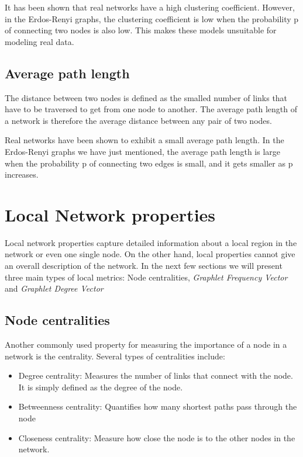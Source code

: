 It has been shown that real networks have a high clustering coefficient.
However, in the Erdos-Renyi graphs, the clustering coefficient is low when the
probability p of connecting two nodes is also low. This makes these
models unsuitable for modeling real data.

\subsection{Average path length}

The distance between two nodes is defined as the smalled number of links that
have to be traversed to get from one node to another. The average path length
of a network is therefore the average distance between any pair of two nodes. 

Real networks have been shown to exhibit a small average path length. In the
Erdos-Renyi graphs we have just mentioned, the average path length is large
when the probability p of connecting two edges is small, and it gets smaller as
p increases.





\section{Local Network properties}

Local network properties capture detailed information about a local region in
the network or even one single node. On the other hand, local properties cannot
give an overall description of the network. In the next few sections we will
present three main types of local metrics: Node centralities, \emph{Graphlet
Frequency Vector} and \emph{Graphlet Degree Vector}

\subsection{Node centralities}

Another commonly used property for measuring the importance of a node in a
network is the centrality. Several types of centralities include:
\begin{itemize}
 \item Degree centrality: Measures the number of links that connect with the
node. It is simply defined as the degree of the node.
 \item Betweenness centrality: Quantifies how many shortest paths pass through
the node
 \item Closeness centrality: Measure how close the node is to the other nodes
in the network.
\end{itemize}

